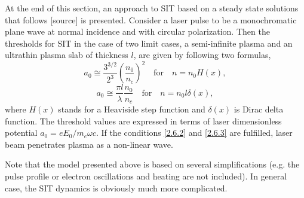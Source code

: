 At the end of this section, an approach to SIT based on a steady state solutions that follows [source] is presented. Consider a laser pulse to be a monochromatic plane wave at normal incidence and with circular polarization. Then the thresholds for SIT in the case of two limit cases, a semi-infinite plasma and an ultrathin plasma slab of thickness $ l $, are given by following two formulas,
\begin{equation}
\label{2.6.2}
a_0 \cong \frac{3^{3/2}}{2^3} \left( \frac{n_0}{n_c} \right)^2 \quad \mathrm{for} \quad n = n_0 H\left(x \right),
\end{equation}
\begin{equation}
\label{2.6.3}
a_0 \cong \frac{\pi l}{\lambda} \frac{n_0}{n_c} \quad \mathrm{for} \quad  n = n_0 l \delta\left(x \right),
\end{equation}
where $ H\left(x \right) $ stands for a Heaviside step function and $ \delta\left(x \right) $ is Dirac delta function. The threshold values are expressed in terms of laser dimensionless potential $ a_0 = e E_0/m_e \omega c $. If the conditions \ref{2.6.2} and \ref{2.6.3} are fulfilled, laser beam penetrates plasma as a non-linear wave.
 
Note that the model presented above is based on several simplifications (e.g. the pulse profile or electron oscillations and heating are not included). In general case, the SIT dynamics is obviously much more complicated.
